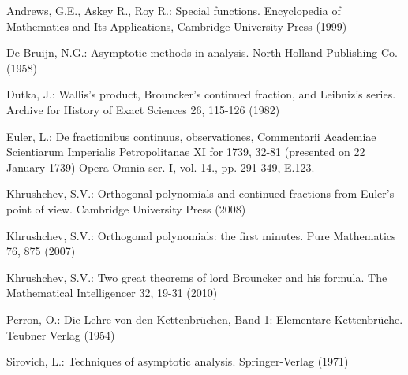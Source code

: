 \documentclass[a4paper,10pt]{article}      %
\begin{document}
\begin{thebibliography}{}

 Andrews, G.E., Askey R., Roy R.: Special functions. Encyclopedia
of Mathematics and Its Applications, Cambridge University Press
(1999)

De Bruijn, N.G.: Asymptotic methods in analysis. North-Holland Publishing Co. (1958)

Dutka, J.: Wallis's product, Brouncker's continued fraction, and Leibniz's series. Archive for History of Exact Sciences 26, 115-126 (1982)

Euler, L.: De fractionibus continuus, observationes, Commentarii Academiae Scientiarum Imperialis Petropolitanae XI for 1739, 32-81 (presented on 22 January 1739) Opera Omnia ser. I, vol. 14., pp. 291-349, E.123.

Khrushchev, S.V.: Orthogonal polynomials and continued fractions from Euler's point of view. Cambridge University Press (2008)

Khrushchev, S.V.: Orthogonal polynomials: the first minutes.
Pure Mathematics 76, 875 (2007)

Khrushchev, S.V.: Two great theorems of lord Brouncker and his formula.
The Mathematical Intelligencer 32, 19-31 (2010)

Perron, O.: Die Lehre von den Kettenbr\"{u}chen, Band 1: Elementare Kettenbr\"{u}che. Teubner Verlag (1954)

Sirovich, L.: Techniques of asymptotic analysis. Springer-Verlag (1971)

\end{thebibliography}
\end{document}
